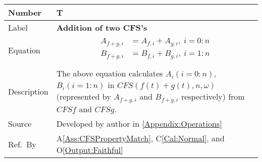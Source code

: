 \documentclass[12pt]{article}
\newcommand{\colAwidth}{0.13\textwidth}
\newcommand{\colBwidth}{0.82\textwidth}
\newcounter{theorynum} %
\newcommand{\aref}[1]{A\ref{#1}}
\newcommand{\calref}[1]{C\ref{#1}}
\newcommand{\oref}[1]{O\ref{#1}}
\begin{document}
~\newline
\noindent
\begin{minipage}{\textwidth}
	\renewcommand*{\arraystretch}{1.5}
	\begin{tabular}{| p{\colAwidth} | p{\colBwidth}|}
		\hline
		\rowcolor[gray]{0.9}
		Number& T{theorynum}\thetheorynum \label{T:Addition}\\
		\hline
		Label&\bf Addition of two CFS's\\
		\hline
		Equation&  
		\begin{equation}
		\begin{aligned}
		A_{f+g, i}
		&=A_{f, i} + A_{g, i},~i=0:n\\
		B_{f+g, i}
		&=B_{f, i} + B_{g, i},~i=1:n\\
		\end{aligned}
		\end{equation}\\
		\hline
		Description & The above equation calculates $A_i (i=0:n)$, $B_i(i=1:n)$ in $\mathit{CFS}(f(t)+g(t), n, \omega)$ (represented by $A_{f+g, i}$ and $B_{f+g, i}$ respectively) from $\mathit{CFSf}$ and $\mathit{CFSg}$.\\
		
		\hline
		Source & Developed by author in \autoref{Appendix:Operations}\\
		\hline
		Ref.\ By & \aref{Ass:CFSPropertyMatch}, \calref{Cal:Normal}, and \oref{Output:Faithful}\\
		\hline
	\end{tabular}
\end{minipage}\\
~\newline
\noindent
\end{document}
